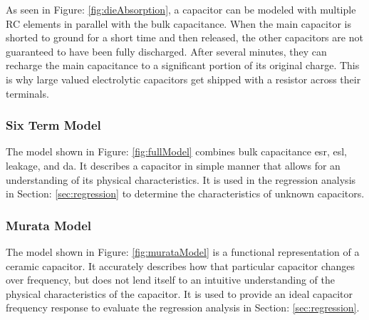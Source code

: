 As seen in Figure: \ref{fig:dieAbsorption}, a capacitor can be modeled with multiple RC elements in parallel with the bulk capacitance. When the main capacitor is shorted to ground for a short time and then released, the other capacitors are not guaranteed to have been fully discharged. After several minutes, they can recharge the main capacitance to a significant portion of its original charge. This is why large valued electrolytic capacitors get shipped with a resistor across their terminals.

\subsubsection{Six Term Model}


The model shown in Figure: \ref{fig:fullModel} combines bulk capacitance \gls{esr}, \gls{esl}, leakage, and \gls{da}. It describes a capacitor in simple manner that allows for an understanding of its physical characteristics. It is used in the regression analysis in Section: \ref{sec:regression} to determine the characteristics of unknown capacitors.

\subsubsection{Murata Model}


The model shown in Figure: \ref{fig:murataModel} is a functional representation of a ceramic capacitor. It accurately describes how that particular capacitor changes over frequency, but does not lend itself to an intuitive understanding of the physical characteristics of the capacitor. It is used to provide an ideal capacitor frequency response to evaluate the regression analysis in Section: \ref{sec:regression}.

